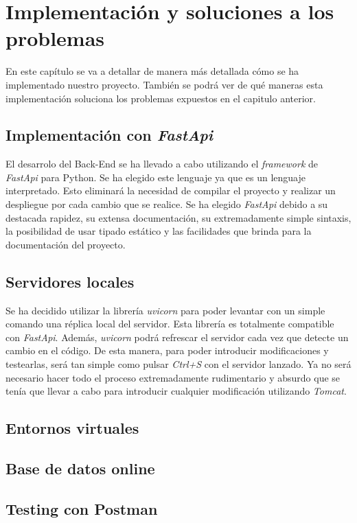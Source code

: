 \documentclass[12pt]{report}
\begin{document}
\chapter{Implementación y soluciones a los problemas}
En este capítulo se va a detallar de manera más detallada cómo se ha implementado nuestro proyecto. También se podrá ver de qué maneras esta implementación soluciona los problemas expuestos en el capitulo anterior. 
\section{Implementación con \textit{FastApi}}
El desarrolo del Back-End se ha llevado a cabo utilizando el \textit{framework} de \textit{FastApi} para Python. Se ha elegido este lenguaje ya que es un lenguaje interpretado. Esto eliminará la necesidad de compilar el proyecto y realizar un despliegue por cada cambio que se realice.
Se ha elegido \textit{FastApi} debido a su destacada rapidez, su extensa documentación, su extremadamente simple sintaxis, la posibilidad de usar tipado estático y las facilidades que brinda para la documentación del proyecto.
\section{Servidores locales}
Se ha decidido utilizar la librería \textit{uvicorn} para poder levantar con un simple comando una réplica local del servidor. Esta librería es totalmente compatible con \textit{FastApi}. Además, \textit{uvicorn} podrá refrescar el servidor cada vez que detecte un cambio en el código. De esta manera, para poder introducir modificaciones y testearlas, será tan simple como pulsar \textit{Ctrl+S} con el servidor lanzado. Ya no será necesario hacer todo el proceso extremadamente rudimentario y absurdo que se tenía que llevar a cabo para introducir cualquier modificación utilizando \textit{Tomcat}.
\section{Entornos virtuales}%

\section{Base de datos online} %
\section{Testing con Postman} %
\end{document}
